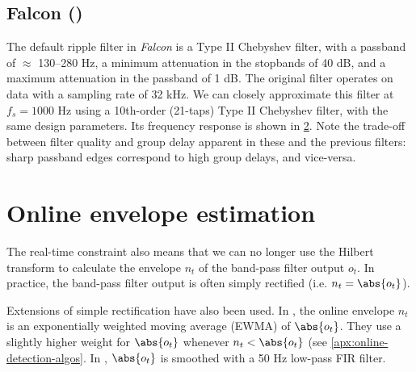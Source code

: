 \begin{figure}
\label{fig:dutta}
\end{figure}


\subsection{Falcon ()}

The default ripple filter in \emph{Falcon} is a Type II Chebyshev filter, with a passband of $\approx$ 130--280 Hz, a minimum attenuation in the stopbands of 40 dB, and a maximum attenuation in the passband of 1 dB. The original filter operates on data with a sampling rate of 32 kHz. We can closely approximate this filter at $f_s = 1000$ Hz using a 10th-order (21-taps) Type II Chebyshev filter, with the same design parameters. Its frequency response is shown in \cref{fig:falcon}. Note the trade-off between filter quality and group delay apparent in these and the previous filters: sharp passband edges correspond to high group delays, and vice-versa.

\begin{figure}
\label{fig:falcon}
\end{figure}







\section{Online envelope estimation}

The real-time constraint also means that we can no longer use the Hilbert transform to calculate the envelope $n_t$ of the band-pass filter output $o_t$. In practice, the band-pass filter output is often simply rectified (i.e. $n_t = \abs{o_t}$).

Extensions of simple rectification have also been used. In , the online envelope $n_t$ is an exponentially weighted moving average (EWMA) of $\abs{o_t}$. They use a slightly higher weight for $\abs{o_t}$  whenever $n_t < \abs{o_t}$ (see \cref{apx:online-detection-algos}. In , $\abs{o_t}$ is smoothed with a 50 Hz low-pass FIR filter.

